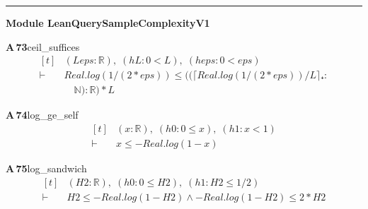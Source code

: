 \documentclass[conference]{IEEEtran}
\theoremstyle{definition}
\newcommand{\lean}[1]{\textsf{\footnotesize #1}}
\begin{document}
\vspace{4pt}\noindent\rule{\columnwidth}{0.4pt}\par\vspace{2pt}
\noindent\textbf{Module \lean{LeanQuerySampleComplexityV1}}\par\vspace{3pt}

\noindent\textbf{A\,73}\quad\lean{ceil\_suffices}
{\footnotesize\[ \begin{aligned}[t]
&(\mathit{L} \mathit{eps} : \mathbb{R} ),\; (\mathit{hL} : 0 < \mathit{L}),\; (\mathit{heps} : 0 < \mathit{eps})\\
\vdash\;&\mathit{Real}.\mathit{log} (1 / (2 * \mathit{eps})) \leq ((\lceil \mathit{Real}.\mathit{log} (1 / (2 * \mathit{eps})) / \mathit{L}\rceil ₊ :\\
&\quad \mathbb{N} ) : \mathbb{R} ) * \mathit{L}
\end{aligned} \]}

\noindent\textbf{A\,74}\quad\lean{log\_ge\_self}
{\footnotesize\[ \begin{aligned}[t]
&(\mathit{x} : \mathbb{R} ),\; (\mathit{h0} : 0 \leq \mathit{x}),\; (\mathit{h1} : \mathit{x} < 1)\\
\vdash\;&\mathit{x} \leq -\mathit{Real}.\mathit{log} (1 - \mathit{x})
\end{aligned} \]}

\noindent\textbf{A\,75}\quad\lean{log\_sandwich}
{\footnotesize\[ \begin{aligned}[t]
&(\mathit{H2} : \mathbb{R} ),\; (\mathit{h0} : 0 \leq \mathit{H2}),\; (\mathit{h1} : \mathit{H2} \leq 1/2)\\
\vdash\;&\mathit{H2} \leq -\mathit{Real}.\mathit{log} (1 - \mathit{H2}) \wedge -\mathit{Real}.\mathit{log} (1 - \mathit{H2}) \leq 2 * \mathit{H2}
\end{aligned} \]}
\end{document}
